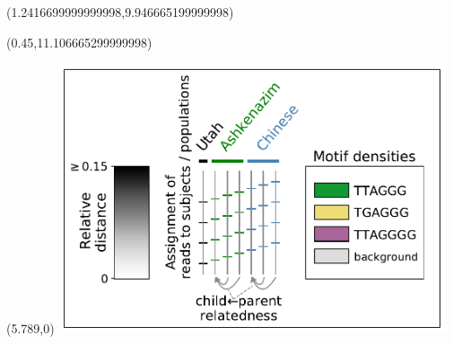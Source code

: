 \documentclass{article}
\begin{document}
\begin{textblock}{13}(1.2416699999999998,9.946665199999998)\end{textblock}
\begin{textblock}{13}(0.45,11.106665299999998)\end{textblock}
\begin{textblock}{13}(5.789,0)
\includegraphics[width=4.500in,keepaspectratio]{Figure_5/legend.pdf}
\end{textblock}
\end{document}
